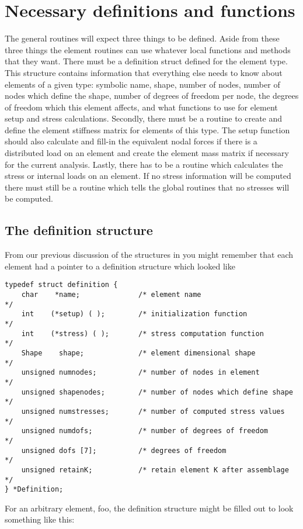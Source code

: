 \section{Necessary definitions and functions}

The general routines will expect three things to be defined.  Aside from 
these three things the element routines can use whatever local functions 
and methods 
that they want.  There must be a definition struct defined for the element 
type.  This structure contains information that everything else needs to know 
about elements of a given type: symbolic name, shape, number of nodes, number 
of nodes which define the shape, number of degrees of freedom per node, the 
degrees of freedom which this element affects, and what functions to use for
element setup and stress calculations.  Secondly, there must be a 
routine to create and define the element stiffness matrix for elements of 
this type.  The setup function should also calculate and fill-in the 
equivalent nodal forces if there is a distributed load on an element and
create the element mass matrix if necessary for the current analysis.  
Lastly, 
there has to be a routine which calculates the stress or internal loads on an 
element.  If no stress information will be computed there must still be a 
routine which tells the global routines that no stresses will be computed.  

\subsection{The definition structure}

From our previous discussion of the structures in \felt{} you might remember
that each element had a pointer to a definition structure which looked like
{\small
\begin{screen}
 \begin{verbatim}
typedef struct definition {
    char    *name;              /* element name                       */
    int    (*setup) ( );        /* initialization function            */
    int    (*stress) ( );       /* stress computation function        */
    Shape    shape;             /* element dimensional shape          */
    unsigned numnodes;          /* number of nodes in element         */
    unsigned shapenodes;        /* number of nodes which define shape */
    unsigned numstresses;       /* number of computed stress values   */
    unsigned numdofs;           /* number of degrees of freedom       */
    unsigned dofs [7];          /* degrees of freedom                 */
    unsigned retainK;           /* retain element K after assemblage  */
} *Definition;
 \end{verbatim}
\end{screen}}
For an arbitrary element, foo, the definition structure might be filled out to
look something like this:

